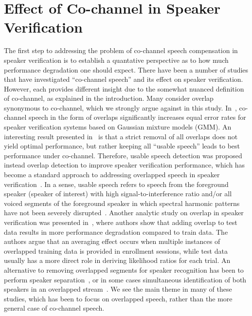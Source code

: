 \section{Effect of Co-channel in Speaker Verification}
\label{sec:cochannl_in_sid}

The first step to addressing the problem of co-channel speech compensation in speaker verification is to establish a quantative perspective as to how much performance degradation one should expect. 
There have been a number of studies that have investigated ``co-channel speech'' and its effect on speaker verification. 
However, each provides different insight due to the somewhat nuanced definition of co-channel, as explained in the introduction. 
Many consider overlap synonymous to co-channel, which we strongly argue against in this study. 
In~\cite{yantorno_report}, co-channel speech in the form of overlaps significantly increases equal error rates for speaker verification systems based on Gaussian mixture models (GMM). 
An interesting result presented in~\cite{yantorno_report} is that a strict removal of all overlaps does not yield optimal performance, but rather keeping all ``usable speech'' leads to best performance under co-channel.  
Therefore, usable speech detection was proposed instead overlap detection to improve speaker verification performance, which has become a standard approach to addressing overlapped speech in speaker verification~\cite{Dwang_03, Dwang_03_trans}. 
In a sense, usable speech refers to speech from the foreground speaker (speaker of interest) with high signal-to-interference ratio and/or all voiced segments of the foreground speaker in which spectral harmonic patterns have not been severely disrupted~\cite{smolenski2011usable}. 
Another analytic study on overlap in speaker verification was presented in~\cite{navid_pyknogram_jp}, where authors show that adding overlap to test data results in more performance degradation compared to train data. 
The authors argue that an averaging effect occurs when multiple instances of overlapped training data is provided in enrollment sessions, while test data usually has a more direct role in deriving likelihood ratios for each trial. 
An alternative to removing overlapped segments for speaker recognition has been to perform speaker separation~\cite{saeidi2010signal, mowlaee2010joint}, or in some cases simultaneous identification of both speakers in an overlapped stream~\cite{zhao2015cochannel, sadjadi_heck_icassp14}. 
We see the main theme in many of these studies, which has been to focus on overlapped speech, rather than the more general case of co-channel speech. 
